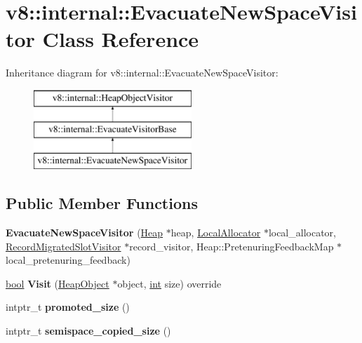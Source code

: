 \hypertarget{classv8_1_1internal_1_1EvacuateNewSpaceVisitor}{}\section{v8\+:\+:internal\+:\+:Evacuate\+New\+Space\+Visitor Class Reference}
\label{classv8_1_1internal_1_1EvacuateNewSpaceVisitor}
Inheritance diagram for v8\+:\+:internal\+:\+:Evacuate\+New\+Space\+Visitor\+:\begin{figure}[H]
\begin{center}
\leavevmode
\includegraphics[height=3.000000cm]{classv8_1_1internal_1_1EvacuateNewSpaceVisitor}
\end{center}
\end{figure}
\subsection*{Public Member Functions}
\begin{DoxyCompactItemize}
\item 
\mbox{\label{classv8_1_1internal_1_1EvacuateNewSpaceVisitor_ad9cc878be3e92074e16c5732a097e028}} 
{\bfseries Evacuate\+New\+Space\+Visitor} (\mbox{\hyperlink{classv8_1_1internal_1_1Heap}{Heap}} $\ast$heap, \mbox{\hyperlink{classv8_1_1internal_1_1LocalAllocator}{Local\+Allocator}} $\ast$local\+\_\+allocator, \mbox{\hyperlink{classv8_1_1internal_1_1RecordMigratedSlotVisitor}{Record\+Migrated\+Slot\+Visitor}} $\ast$record\+\_\+visitor, Heap\+::\+Pretenuring\+Feedback\+Map $\ast$local\+\_\+pretenuring\+\_\+feedback)
\item 
\mbox{\label{classv8_1_1internal_1_1EvacuateNewSpaceVisitor_a4e56675e6986b20f9f2b55ef34084a95}} 
\mbox{\hyperlink{classbool}{bool}} {\bfseries Visit} (\mbox{\hyperlink{classv8_1_1internal_1_1HeapObject}{Heap\+Object}} $\ast$object, \mbox{\hyperlink{classint}{int}} size) override
\item 
\mbox{\label{classv8_1_1internal_1_1EvacuateNewSpaceVisitor_a5f6cb02b7a390f271ba17d2a67225665}} 
intptr\+\_\+t {\bfseries promoted\+\_\+size} ()
\item 
\mbox{\label{classv8_1_1internal_1_1EvacuateNewSpaceVisitor_af3370875fe71268897de4e0e641f591e}} 
intptr\+\_\+t {\bfseries semispace\+\_\+copied\+\_\+size} ()
\end{DoxyCompactItemize}
